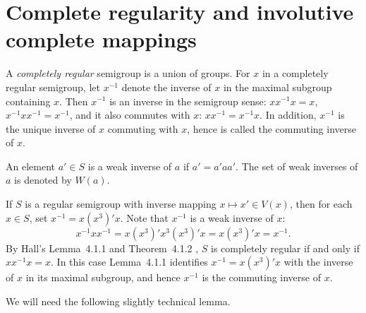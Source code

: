 \documentclass[11pt]{article}
\theoremstyle{plain}
\theoremstyle{remark}
\theoremstyle{definition}
\theoremstyle{plain}
\newcommand{\inv}{^{-1}}
\begin{document}
\section{Complete regularity and involutive complete mappings}
\label{Sec:CR_involutions}

A \emph{completely regular} semigroup is a union of groups. For $x$ in a completely regular semigroup,
let $x\inv$ denote the inverse of $x$ in the maximal subgroup containing $x$. Then $x\inv$ is an inverse
in the semigroup sense: $xx\inv x=x$, $x\inv xx\inv =x\inv$, and it also commutes with $x$:
$xx\inv=x\inv x$. In addition, $x\inv$ is the unique inverse of $x$ commuting with $x$, hence is
called the commuting inverse of $x$.

An element $a'\in S$ is a weak inverse of $a$ if $a'=a'aa'$. The set of weak inverses of $a$ is denoted by $W(a)$.

If $S$ is a regular semigroup with inverse mapping $x\mapsto x'\in V(x)$, then for each $x\in S$, set
\(x\inv = x(x^3)'x.\)
Note that $x\inv$ is a weak inverse of $x$:
\begin{equation}\label{Eqn:CR-out}
x\inv xx\inv = x(x^3)'x^3(x^3)'x = x(x^3)'x = x\inv.
\end{equation}
{By Hall's Lemma~4.1.1 and Theorem~4.1.2 \cite[Lemma~4.1.1 and Theorem~4.1.2]{Hall89}, $S$ is completely regular if and only if $xx\inv x=x$. In this case Lemma~4.1.1 identifies $x\inv=x(x^3)'x$ with the inverse of $x$ in its maximal subgroup, and hence $x\inv$ is the commuting inverse of $x$.}

We will need the following slightly technical lemma.
\end{document}
